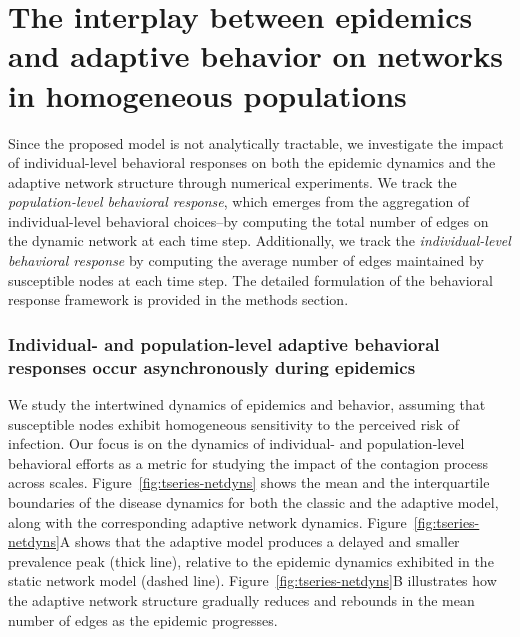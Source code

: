 \documentclass[9pt,twocolumn,twoside]{pnas-new}
\begin{document}
\section*{The interplay between epidemics and adaptive behavior on networks in homogeneous populations}
%
Since the proposed model is not analytically tractable, we investigate the impact of individual-level behavioral responses on both the epidemic dynamics and the adaptive network structure through numerical experiments.
%
We track the {\em population-level behavioral response}, which emerges from the aggregation of individual-level behavioral choices--by computing the total number of edges on the dynamic network at each time step.
Additionally, we track the {\em individual-level behavioral response} by computing the average number of edges maintained by susceptible nodes at each time step. The detailed formulation of the behavioral response framework is provided in the methods section.

\subsubsection*{Individual- and population-level adaptive behavioral responses occur asynchronously during epidemics}
%
We study the intertwined dynamics of epidemics and behavior, assuming that susceptible nodes exhibit homogeneous sensitivity to the perceived risk of infection.
%
Our focus is on the dynamics of individual- and population-level behavioral efforts as a metric for studying the impact of the contagion process across scales.
%
Figure~\ref{fig:tseries-netdyns} shows the mean and the interquartile boundaries of the disease dynamics for both the classic and the adaptive model, along with the corresponding adaptive network dynamics.
%
Figure~\ref{fig:tseries-netdyns}A shows that the adaptive model produces a delayed and smaller prevalence peak (thick line), relative to the epidemic dynamics exhibited in the static network model (dashed line).
Figure~\ref{fig:tseries-netdyns}B illustrates how the adaptive network structure gradually reduces and rebounds in the mean number of edges as the epidemic progresses.
\end{document}
